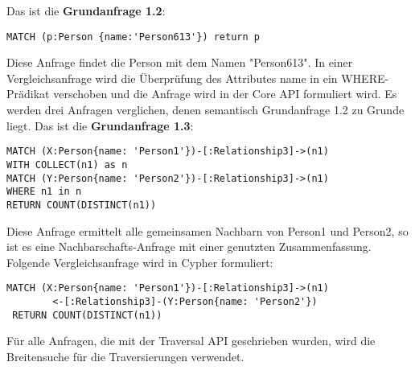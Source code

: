 \noindent Das ist die \textbf{Grundanfrage 1.2}: 
\begin{Verbatim}[frame=single]
MATCH (p:Person {name:'Person613'}) return p
\end{Verbatim} 
Diese Anfrage findet die Person mit dem Namen "Person613". In einer Vergleichsanfrage wird die Überprüfung des Attributes name in ein WHERE-Prädikat verschoben und die Anfrage wird in der Core API formuliert wird. Es werden drei Anfragen verglichen, denen semantisch Grundanfrage 1.2 zu Grunde liegt.\newline \newline
Das ist die \textbf{Grundanfrage 1.3}: 
\begin{Verbatim}[frame=single]
MATCH (X:Person{name: 'Person1'})-[:Relationship3]->(n1) 
WITH COLLECT(n1) as n 
MATCH (Y:Person{name: 'Person2'})-[:Relationship3]->(n1) 
WHERE n1 in n
RETURN COUNT(DISTINCT(n1))
\end{Verbatim} 
Diese Anfrage ermittelt alle gemeinsamen Nachbarn von Person1 und Person2, so ist es eine Nachbarschafts-Anfrage mit einer genutzten Zusammenfassung. Folgende Vergleichsanfrage wird  in Cypher formuliert:
\begin{Verbatim}[frame=single]
 MATCH (X:Person{name: 'Person1'})-[:Relationship3]->(n1)
 		<-[:Relationship3]-(Y:Person{name: 'Person2'}) 
 RETURN COUNT(DISTINCT(n1))
\end{Verbatim} 
Für alle Anfragen, die mit der Traversal API geschrieben wurden, wird die Breitensuche für die Traversierungen verwendet. 
